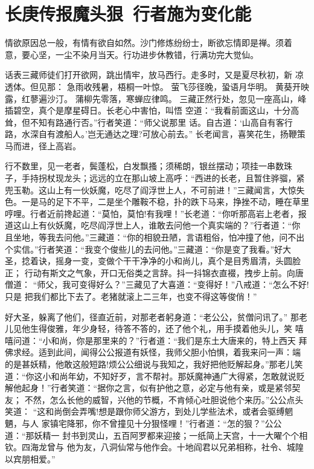 \chapter{长庚传报魔头狠~行者施为变化能}

情欲原因总一般，有情有欲自如然。沙门修炼纷纷士，断欲忘情即是禅。须着
意，要心坚，一尘不染月当天。行功进步休教错，行满功完大觉仙。

话表三藏师徒们打开欲网，跳出情牢，放马西行。走多时，又是夏尽秋初，新
凉透体。但见那：
急雨收残暑，梧桐一叶惊。
萤飞莎径晚，蛩语月华明。
黄葵开映露，红蓼遍沙汀。
蒲柳先零落，寒蝉应律鸣。
三藏正然行处，忽见一座高山，峰插碧空，真个是摩星碍日。长老心中害怕，叫悟
空道：“我看前面这山，十分高耸，但不知有路通行否。”行者笑道：“师父说那里
话。自古道：‘山高自有客行路，水深自有渡船人。’岂无通达之理?可放心前去。”
长老闻言，喜笑花生，扬鞭策马而进，径上高岩。

行不数里，见一老者，鬓蓬松，白发飘搔；须稀朗，银丝摆动；项挂一串数珠
子，手持拐杖现龙头；远远的立在那山坡上高呼：“西进的长老，且暂住骅骝，紧
兜玉勒。这山上有一伙妖魔，吃尽了阎浮世上人，不可前进！”三藏闻言，大惊失
色。一是马的足下不平，二是坐个雕鞍不稳，扑的跌下马来，挣挫不动，睡在草里
哼哩。行者近前搀起道：“莫怕，莫怕!有我哩！”长老道：“你听那高岩上老者，报
道这山上有伙妖魔，吃尽阎浮世上人，谁敢去问他一个真实端的？”行者道：“你
且坐地，等我去问他。”三藏道：“你的相貌丑陋，言语粗俗，怕冲撞了他，问不出
个实信。”行者笑道：“我变个俊些儿的去问他。”三藏道：“你是变了我看。”好大
圣，捻着诀，摇身一变，变做个干干净净的小和尚儿，真个是目秀眉清，头圆脸正；
行动有斯文之气象，开口无俗类之言辞。抖一抖锦衣直裰，拽步上前。向唐僧道：
“师父，我可变得好么？”三藏见了大喜道：“变得好！”八戒道：“怎么不好!只是
把我们都比下去了。老猪就滚上二三年，也变不得这等俊俏！”

好大圣，躲离了他们，径直近前，对那老者躬身道：“老公公，贫僧问讯了。”
那老儿见他生得俊雅，年少身轻，待答不答的，还了他个礼，用手摸着他头儿，笑
嘻嘻问道：“小和尚，你是那里来的？”行者道：“我们是东土大唐来的，特上西天
拜佛求经。适到此间，闻得公公报道有妖怪，我师父胆小怕惧，着我来问一声：端
的是甚妖精，他敢这般短路!烦公公细说与我知之，我好把他贬解起身。”那老儿笑
道：“你这小和尚年幼，不知好歹，言不帮衬。那妖魔神通广大得紧，怎敢就说贬
解他起身！”行者笑道：“据你之言，似有护他之意，必定与他有亲，或是紧邻契友；
不然，怎么长他的威智，兴他的节概，不肯倾心吐胆说他个来历。”公公点头笑道：
“这和尚倒会弄嘴!想是跟你师父游方，到处儿学些法术，或者会驱缚魍魉，与人
家镇宅降邪，你不曾撞见十分狠怪哩！”行者道：“怎的狠？”公公道：“那妖精一
封书到灵山，五百阿罗都来迎接；一纸简上天宫，十一大曜个个相钦。四海龙曾与
他为友，八洞仙常与他作会。十地阎君以兄弟相称，社令、城隍以宾朋相爱。”

